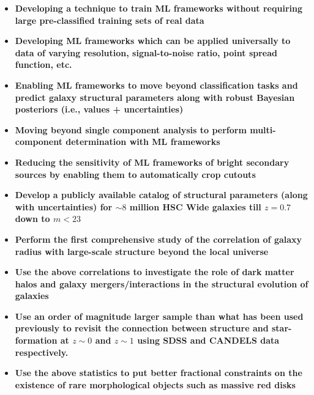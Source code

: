 \begin{tcolorbox}[breakable,colback=blue!5!white,colframe=blue!75!black,title=\textbf{Key Technical Goals}]
\begin{itemize}
 \setlength\itemsep{-0.1em}
\item \textbf{Developing a technique to train ML frameworks without requiring large pre-classified training sets of real data}
\item \textbf{Developing ML frameworks which can be applied universally to data of varying resolution, signal-to-noise ratio, point spread function, etc.}
\item \textbf{Enabling ML frameworks to move beyond classification tasks and predict galaxy structural parameters along with robust Bayesian posteriors (i.e., values + uncertainties)}
\item \textbf{Moving beyond single component analysis to perform multi-component determination with ML frameworks}
\item \textbf{Reducing the sensitivity of ML frameworks of bright secondary sources by enabling them to automatically crop cutouts}
\end{itemize}
\end{tcolorbox}

\begin{tcolorbox}[breakable,colback=blue!5!white,colframe=blue!75!black,title=\textbf{Key Science Goals}]
\begin{itemize}
 \setlength\itemsep{-0.1em}
\item \textbf{Develop a publicly available catalog of structural parameters (along with uncertainties) for $\sim8$ million HSC Wide galaxies till $z=0.7$ down to $m < 23$}
\end{itemize}
\tcblower
\begin{itemize}
\setlength\itemsep{-0.1em}
\item \textbf{Perform the first comprehensive study of the correlation of galaxy radius with large-scale structure beyond the local universe}
\item \textbf{Use the above correlations to investigate the role of dark matter halos and galaxy mergers/interactions in the structural evolution of galaxies}
\end{itemize}
\vspace{-0.25in}
\DrawLine
\vspace{-0.15in}
\begin{itemize}
\setlength\itemsep{-0.1em}
\item \textbf{Use an order of magnitude larger sample than what has been used previously to revisit the connection between structure and star-formation at $z\sim0$ and $z\sim1$ using SDSS and CANDELS data respectively.}
\item \textbf{Use the above statistics to put better fractional constraints on the existence of rare morphological objects such as massive red disks}
\end{itemize}
\end{tcolorbox}


